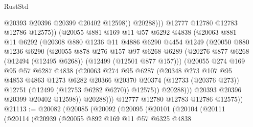 \begin{lexlean}{RustStd}
\begin{coremodule}
{\begin{coremodule}
{{{{{{{{{{{{{{{{{{{{{{{{{{{{{{{{{{{{{{{{{{{{{{{{{{{{{{{{{{{{{{{{{{{{{{{{{{{{{{{{                          @20393
                          @20396
                          @20399
                          @20402
                          @12598))
                      @20288)))
                @12777
                @12780
                @12783
                @12786
                @12575))
            (@20055
              @881
              @169
              @11
              @57
              @6292
              @4838
              (@20063
                @881
                @11
                @6292
                (@20308
                  @880
                  @1236
                  @11
                  @4886
                  @6290
                  @4454
                  @1249
                  (@20050
                    @880
                    @1236
                    @6290
                    (@20055
                      @878
                      @276
                      @157
                      @97
                      @6268
                      @6289
                      (@20276 @877 @6268 (@12494 (@12495 @6268)) (@12499 (@12501 @877 @157)))
                      (@20055
                        @274
                        @169
                        @95
                        @57
                        @6287
                        @4838
                        (@20063
                          @274
                          @95
                          @6287
                          (@20348
                            @273
                            @107
                            @95
                            @4853
                            @4863
                            @1273
                            @6282
                            @20366
                            @20370
                            @20374
                            (@12733 (@20376 @273))
                            @12751
                            (@12499 (@12753 @6282 @6270))
                            @12575))
                        @20288)))
                  @20393
                  @20396
                  @20399
                  @20402
                  @12598))
              @20288)))
        @12777
        @12780
        @12783
        @12786
        @12575))
@21113 := @20082
    (@20085
      (@20092
        (@20095
          (@20101
            (@20104
              (@20111
                (@20114
                  (@20939
                    (@20055
                      @892
                      @169
                      @11
                      @57
                      @6325
                      @4838
}}}}}}}}}}}}}}}}}}}}}}}}}}}}}}}}}}}}}}}}}}}}}}}}}}}}}}}}}}}}}}}}}}}}}}}}}}}}}}}}
\end{coremodule}}
\end{coremodule}
\end{lexlean}
